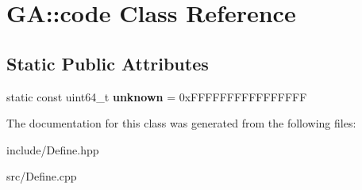 \hypertarget{class_g_a_1_1code}{}\section{GA\+::code Class Reference}
\label{class_g_a_1_1code}
\subsection*{Static Public Attributes}
\begin{DoxyCompactItemize}
\item 
\mbox{\label{class_g_a_1_1code_a90e3afd35039ea1bd0cd1587e6c0cdd9}} 
static const uint64\+\_\+t {\bfseries unknown} = 0x\+F\+F\textquotesingle{}\+F\+F\textquotesingle{}\+F\+F\textquotesingle{}\+F\+F\textquotesingle{}\+F\+F\textquotesingle{}\+F\+F\textquotesingle{}\+F\+F\textquotesingle{}\+FF
\end{DoxyCompactItemize}


The documentation for this class was generated from the following files\+:\begin{DoxyCompactItemize}
\item 
include/Define.\+hpp\item 
src/Define.\+cpp\end{DoxyCompactItemize}

